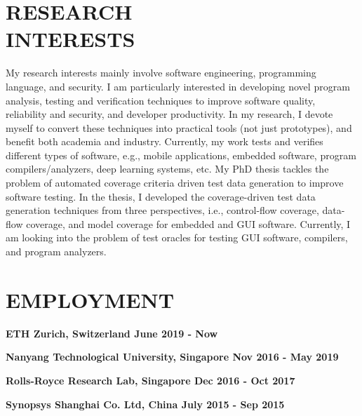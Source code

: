 \documentclass[margin]{res}
\begin{document}
\begin{resume}

\section{RESEARCH\\INTERESTS}
{My research interests mainly involve software engineering, programming language, and security. I am particularly interested in developing novel program analysis, testing and verification techniques to improve software quality, reliability and security, and developer productivity. 
In my research, I devote myself to convert these techniques into practical tools (not just prototypes), and benefit both academia and industry.
Currently, my work tests and verifies different types of software, e.g., mobile applications, embedded software, program compilers/analyzers, deep learning systems, etc. 
My PhD thesis tackles the problem of automated coverage criteria driven test data generation to improve software testing. In the thesis, I developed the coverage-driven test data generation techniques from three perspectives, i.e., control-flow coverage, data-flow coverage, and model coverage for embedded and GUI software. Currently, I am looking into the problem of test oracles for testing GUI software, compilers, and program analyzers.}

\section{EMPLOYMENT}
\textbf{ETH Zurich, Switzerland \hfill{June 2019 - Now}\\}


\textbf{Nanyang Technological University, Singapore \hfill{Nov 2016 - May 2019}\\}

\textbf{Rolls-Royce Research Lab, Singapore \hfill{Dec 2016 - Oct 2017}\\}

\textbf{Synopsys Shanghai Co. Ltd, China \hfill{July 2015 - Sep 2015}\\}


\end{resume}
\end{document}
